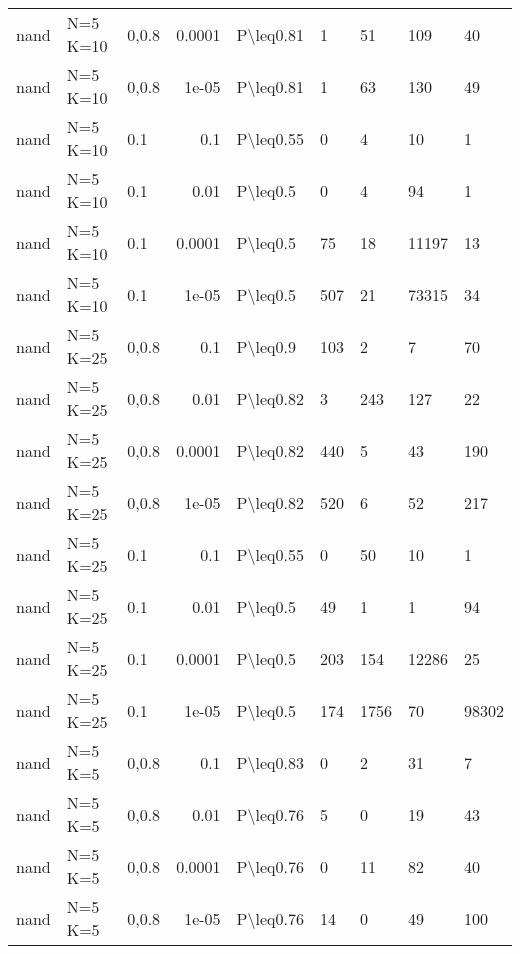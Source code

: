 \begin{longtable}{lllrlllll}
 nand          & N=5 K=10  & 0,0.8 & 0.0001 & P\textbackslash{}leq0.81  & 1    & 51   & 109      & 40      \\
 nand          & N=5 K=10  & 0,0.8 & 1e-05  & P\textbackslash{}leq0.81  & 1    & 63   & 130      & 49      \\
 nand          & N=5 K=10  & 0.1   & 0.1    & P\textbackslash{}leq0.55  & 0    & 4    & 10       & 1       \\
 nand          & N=5 K=10  & 0.1   & 0.01   & P\textbackslash{}leq0.5   & 0    & 4    & 94       & 1       \\
 nand          & N=5 K=10  & 0.1   & 0.0001 & P\textbackslash{}leq0.5   & 75   & 18   & 11197    & 13      \\
 nand          & N=5 K=10  & 0.1   & 1e-05  & P\textbackslash{}leq0.5   & 507  & 21   & 73315    & 34      \\
 nand          & N=5 K=25  & 0,0.8 & 0.1    & P\textbackslash{}leq0.9   & 103  & 2    & 7        & 70      \\
 nand          & N=5 K=25  & 0,0.8 & 0.01   & P\textbackslash{}leq0.82  & 3    & 243  & 127      & 22      \\
 nand          & N=5 K=25  & 0,0.8 & 0.0001 & P\textbackslash{}leq0.82  & 440  & 5    & 43       & 190     \\
 nand          & N=5 K=25  & 0,0.8 & 1e-05  & P\textbackslash{}leq0.82  & 520  & 6    & 52       & 217     \\
 nand          & N=5 K=25  & 0.1   & 0.1    & P\textbackslash{}leq0.55  & 0    & 50   & 10       & 1       \\
 nand          & N=5 K=25  & 0.1   & 0.01   & P\textbackslash{}leq0.5   & 49   & 1    & 1        & 94      \\
 nand          & N=5 K=25  & 0.1   & 0.0001 & P\textbackslash{}leq0.5   & 203  & 154  & 12286    & 25      \\
 nand          & N=5 K=25  & 0.1   & 1e-05  & P\textbackslash{}leq0.5   & 174  & 1756 & 70       & 98302   \\
 nand          & N=5 K=5   & 0,0.8 & 0.1    & P\textbackslash{}leq0.83  & 0    & 2    & 31       & 7       \\
 nand          & N=5 K=5   & 0,0.8 & 0.01   & P\textbackslash{}leq0.76  & 5    & 0    & 19       & 43      \\
 nand          & N=5 K=5   & 0,0.8 & 0.0001 & P\textbackslash{}leq0.76  & 0    & 11   & 82       & 40      \\
 nand          & N=5 K=5   & 0,0.8 & 1e-05  & P\textbackslash{}leq0.76  & 14   & 0    & 49       & 100     \\

\end{longtable}

